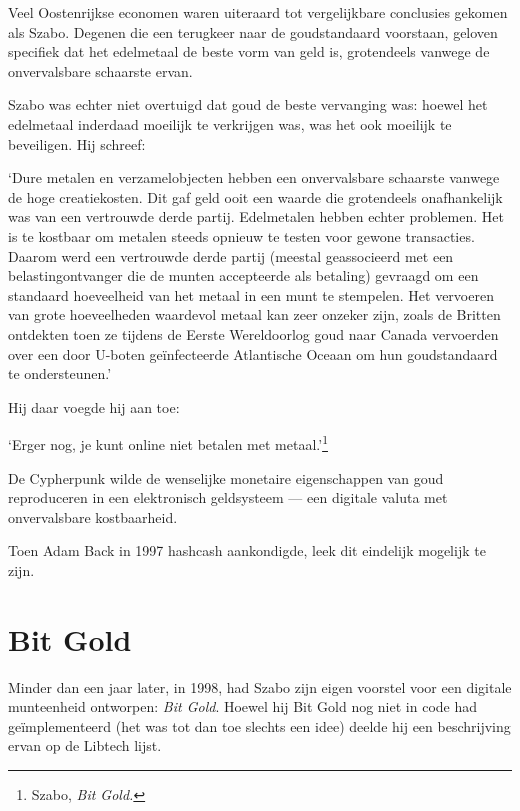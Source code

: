 \documentclass[
  a5paper,
  smalldemyvopaper,11pt,twoside,onecolumn,openright,extrafontsizes,
hidelinks]{memoir}
\renewenvironment{quote}%
               {\list{}{\rightmargin=.3cm\leftmargin=.3cm}%
                \itshape \item[]}%
               {\endlist}
\begin{document}
Veel Oostenrijkse economen waren uiteraard tot vergelijkbare conclusies
gekomen als Szabo. Degenen die een terugkeer naar de goudstandaard
voorstaan, geloven specifiek dat het edelmetaal de beste vorm van geld
is, grotendeels vanwege de onvervalsbare schaarste ervan.

Szabo was echter niet overtuigd dat goud de beste vervanging was: hoewel
het edelmetaal inderdaad moeilijk te verkrijgen was, was het ook
moeilijk te beveiligen. Hij schreef:

\begin{quote}
`Dure metalen en verzamelobjecten hebben een onvervalsbare schaarste
vanwege de hoge creatiekosten. Dit gaf geld ooit een waarde die
grotendeels onafhankelijk was van een vertrouwde derde partij.
Edelmetalen hebben echter problemen. Het is te kostbaar om metalen
steeds opnieuw te testen voor gewone transacties. Daarom werd een
vertrouwde derde partij (meestal geassocieerd met een belastingontvanger
die de munten accepteerde als betaling) gevraagd om een standaard
hoeveelheid van het metaal in een munt te stempelen. Het vervoeren van
grote hoeveelheden waardevol metaal kan zeer onzeker zijn, zoals de
Britten ontdekten toen ze tijdens de Eerste Wereldoorlog goud naar
Canada vervoerden over een door U-boten geïnfecteerde Atlantische Oceaan
om hun goudstandaard te ondersteunen.'
\end{quote}

Hij daar voegde hij aan toe:

\begin{quote}
`Erger nog, je kunt online niet betalen met metaal.'\footnote{Szabo,
  \emph{Bit Gold.}}
\end{quote}

De Cypherpunk wilde de wenselijke monetaire eigenschappen van goud
reproduceren in een elektronisch geldsysteem --- een digitale valuta met
onvervalsbare kostbaarheid.

Toen Adam Back in 1997 hashcash aankondigde, leek dit eindelijk mogelijk
te zijn.

\section{Bit Gold}\label{bit-gold-1}

Minder dan een jaar later, in 1998, had Szabo zijn eigen voorstel voor
een digitale munteenheid ontworpen: \emph{Bit Gold}. Hoewel hij Bit Gold
nog niet in code had geïmplementeerd (het was tot dan toe slechts een
idee) deelde hij een beschrijving ervan op de Libtech lijst.
\end{document}
